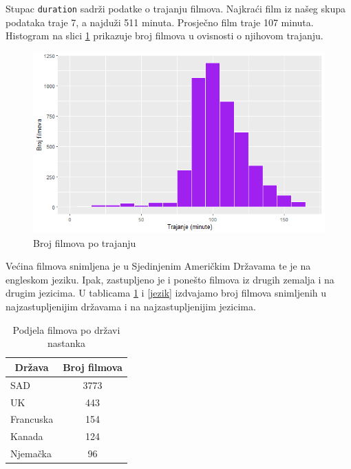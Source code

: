 	 Stupac \texttt{duration} sadrži podatke o trajanju filmova. Najkraći film iz našeg skupa podataka traje 7, a najduži 511 minuta. Prosječno film traje 107 minuta. Histogram na slici \ref{trajanje} prikazuje broj filmova u ovisnosti o njihovom trajanju. 
	 
	  \begin{figure}[H]
	 	\centering
	 	\includegraphics[width=15cm]{../figures/lucija_jednostavni/trajanje.png}
	 	\caption{Broj filmova po trajanju}
	 	\label{trajanje}
	 \end{figure}
	 
	 Većina filmova snimljena je u Sjedinjenim Američkim Državama te je na engleskom jeziku. Ipak, zastupljeno je i ponešto filmova iz drugih zemalja i na drugim jezicima. U tablicama \ref{drzava} i \ref{jezik} izdvajamo broj filmova snimljenih u najzastupljenijim državama i na najzastupljenijim jezicima. 
	 
	 \begin{table}[H]
	 	\centering
	 	\renewcommand{\arraystretch}{1.5} %
	 	\begin{tabular}{|l|c|}
	 		\hline
	 		\multicolumn{1}{|c|}{\textbf{Država}} & \multicolumn{1}{c|}{\textbf{Broj filmova}} \\
	 		\hline
	 		SAD & 3773 \\
	 		\hline
	 		UK & 443  \\
	 		\hline
	 		Francuska & 154  \\
	 		\hline
	 		Kanada & 124  \\
	 		\hline
	 		Njemačka & 96 \\
	 		\hline
	 	\end{tabular}
	 	\caption{Podjela filmova po državi nastanka}
	 	\label{drzava}
	 \end{table} 	 
	 
